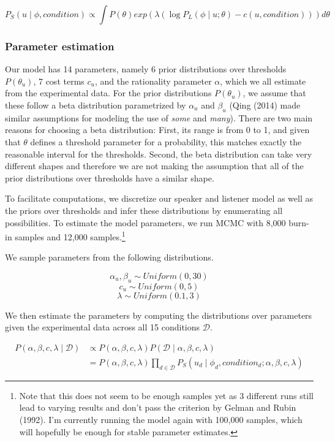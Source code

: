 \documentclass[lucida,biblatex]{sp} %
\begin{document}
$$P_S(u \mid \phi, condition) \propto \int P(\theta) exp\left(\lambda  \left(\log P_L(\phi \mid u; \theta) - c(u, condition)\right)\right) d\theta $$

\subsubsection{Parameter estimation}

Our model has 14 parameters, namely 6 prior distributions over thresholds $P(\theta_u)$, 7 cost terms $c_u$, and the rationality parameter $\alpha$, which we all estimate from the experimental data. For the prior distributions $P(\theta_u)$, we assume that these follow a beta distribution parametrized by $\alpha_u$ and $\beta_u$ (Qing (2014) made similar assumptions for modeling the use of \textit{some} and \textit{many}). There are two main reasons for choosing a beta distribution: First, its range is from 0 to 1, and given that $\theta$ defines a threshold parameter for a probability, this matches exactly the reasonable interval for the thresholds. Second, the beta distribution can take very different shapes and therefore we are not making the assumption that all of the prior distributions over thresholds have a similar shape.

To facilitate computations, we discretize our speaker and listener model as well as the priors over thresholds and infer these distributions by enumerating all possibilities. To estimate the model parameters, we run MCMC with 8,000 burn-in samples and 12,000 samples.\footnote{Note that this does not seem to be enough samples yet as 3 different runs still lead to varying results and don't pass the criterion by Gelman and Rubin (1992). I'm currently running the model again with 100,000 samples, which will hopefully be enough for stable parameter estimates.} 

We sample parameters from the following distributions.

$$\alpha_u, \beta_u \sim Uniform(0,30)$$
$$c_u\sim Uniform(0,5)$$
$$\lambda \sim Uniform(0.1,3)$$

We then estimate the parameters by computing the distributions over parameters given the experimental data across all 15 conditions $\mathscr{D}$.

\begin{align*}
P(\alpha,\beta, c, \lambda \mid \mathscr{D}) &\propto P(\alpha, \beta, c, \lambda) P(\mathscr{D} \mid \alpha,\beta, c, \lambda) \\
&= P(\alpha, \beta, c, \lambda) \prod_{d \in \mathscr{D}} P_S(u_d \mid \phi_d, condition_d; \alpha, \beta, c, \lambda)
\end{align*}
\end{document}

